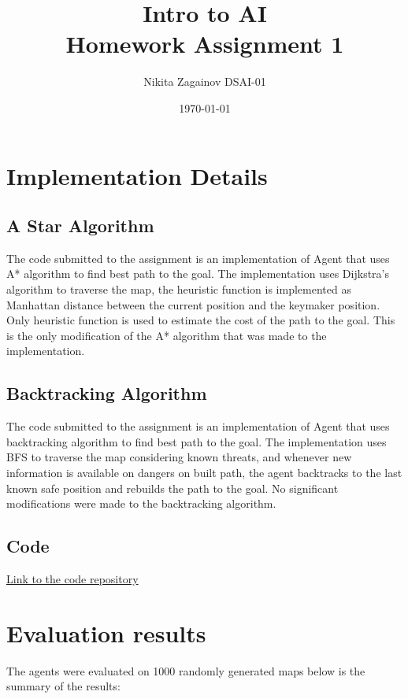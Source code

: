 \documentclass[12pt]{article}
\title{Intro to AI \\ Homework Assignment 1}
\author{Nikita Zagainov DSAI-01}
\date{\today}
\begin{document}
\maketitle

\section{Implementation Details}
\subsection{A Star Algorithm}
The code submitted to the assignment is an implementation of Agent that uses A*
algorithm to find best path to the goal. The implementation uses Dijkstra's
algorithm to traverse the map, the heuristic function is implemented as
Manhattan distance between the current position and the keymaker position. Only
heuristic function is used to estimate the cost of the path to the goal. This
is the only modification of the A* algorithm that was made to the
implementation.

\subsection{Backtracking Algorithm}
The code submitted to the assignment is an implementation of Agent that uses
backtracking algorithm to find best path to the goal. The implementation uses
BFS to traverse the map considering known threats, and whenever new information
is available on dangers on built path, the agent backtracks to the last known
safe position and rebuilds the path to the goal. No significant modifications
were made to the backtracking algorithm.

\subsection{Code}
\href{https://github.com/V1adych/itai_assignment_1}{Link to the code repository}

\section{Evaluation results}
The agents were evaluated on 1000 randomly generated maps below is the summary
of the results:
\end{document}
